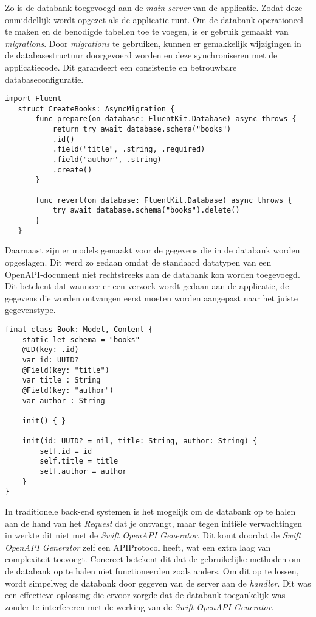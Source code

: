 Zo is de databank toegevoegd aan de \textit{main server} van de applicatie. Zodat deze onmiddellijk wordt opgezet als de applicatie runt. Om de databank operationeel te maken en de benodigde tabellen toe te voegen, is er gebruik gemaakt van \textit{migrations}. Door \textit{migrations} te gebruiken, kunnen er gemakkelijk wijzigingen in de databasestructuur doorgevoerd worden en deze synchroniseren met de applicatiecode. Dit garandeert een consistente en betrouwbare databaseconfiguratie.
\begin{lstlisting}[caption=Migration file]
   import Fluent
   struct CreateBooks: AsyncMigration {
       func prepare(on database: FluentKit.Database) async throws {
           return try await database.schema("books")
           .id()
           .field("title", .string, .required)
           .field("author", .string)
           .create()
       }
       
       func revert(on database: FluentKit.Database) async throws {
           try await database.schema("books").delete()
       }
   } 
\end{lstlisting}

Daarnaast zijn er  models gemaakt voor de gegevens die in de databank worden opgeslagen. Dit werd zo gedaan omdat de standaard datatypen van een OpenAPI-document niet rechtstreeks aan de databank kon worden toegevoegd. Dit betekent dat wanneer er een verzoek wordt gedaan aan de applicatie, de gegevens die worden ontvangen eerst moeten worden aangepast naar het juiste gegevenstype.

\begin{lstlisting}[caption=Model file]
final class Book: Model, Content {
    static let schema = "books"
    @ID(key: .id)
    var id: UUID?
    @Field(key: "title")
    var title : String
    @Field(key: "author")
    var author : String
    
    init() { }
    
    init(id: UUID? = nil, title: String, author: String) {
        self.id = id
        self.title = title
        self.author = author
    }
}
\end{lstlisting}

In traditionele back-end systemen is het mogelijk om de databank op te halen aan de hand van het \textit{Request} dat je ontvangt, maar tegen initiële verwachtingen in werkte dit niet met de \textit{Swift OpenAPI Generator}. Dit komt doordat de \textit{Swift OpenAPI Generator} zelf een APIProtocol heeft, wat een extra laag van complexiteit toevoegt. Concreet betekent dit dat de gebruikelijke methoden om de databank op te halen niet functioneerden zoals anders. Om dit op te lossen, wordt simpelweg de databank door gegeven van de server aan de \textit{handler}. Dit was een effectieve oplossing die ervoor zorgde dat de databank toegankelijk was zonder te interfereren met de werking van de \textit{Swift OpenAPI Generator}.

